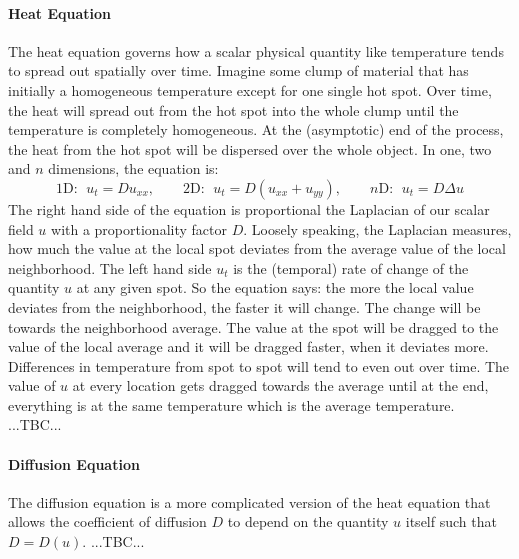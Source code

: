 \paragraph{Heat Equation} 
The heat equation governs how a scalar physical quantity like temperature tends to spread out spatially over time. Imagine some clump of material that has initially a homogeneous temperature except for one single hot spot. Over time, the heat will spread out from the hot spot into the whole clump until the temperature is completely homogeneous. At the (asymptotic) end of the process, the heat from the hot spot will be dispersed over the whole object. In one, two and $n$ dimensions, the equation is:
\begin{equation}
1\text{D: } \; u_{t} = D u_{xx} , \qquad 
2\text{D: } \; u_{t} = D (u_{xx} + u_{yy}), \qquad 
n\text{D: } \; u_{t} = D \Delta u
\end{equation}
The right hand side of the equation is proportional the Laplacian of our scalar field $u$ with a proportionality factor $D$. Loosely speaking, the Laplacian measures, how much the value at the local spot deviates from the average value of the local neighborhood. The left hand side $u_t$ is the (temporal) rate of change of the quantity $u$ at any given spot. So the equation says: the more the local value deviates from the neighborhood, the faster it will change. The change will be towards the neighborhood average. The value at the spot will be dragged to the value of the local average and it will be dragged faster, when it deviates more. Differences in temperature from spot to spot will tend to even out over time. The value of $u$ at every location gets dragged towards the average until at the end, everything is at the same temperature which is the average temperature. ...TBC...






\paragraph{Diffusion Equation} 
The diffusion equation is a more complicated version of the heat equation that allows the coefficient of diffusion $D$ to depend on the quantity $u$ itself such that $D = D(u)$. ...TBC...


